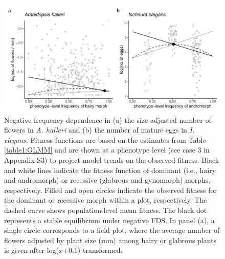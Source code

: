 \documentclass[12pt,]{article}
\begin{document}
\begin{figure}[ht]
  \includegraphics[width=0.75\linewidth]{Ah_Ie_plots.pdf}
  \caption{Negative frequency dependence in (a) the size-adjusted number of flowers in \textit{A. halleri} and (b) the number of mature eggs in \textit{I. elegans}. Fitness functions are based on the estimates from Table \ref{table1:GLMM} and are shown at a phenotype level (see case 3 in Appendix S3) to project model trends on the observed fitness. Black and white lines indicate the fitness function of dominant (i.e., hairy and andromorph) or recessive (glabrous and gynomorph) morphs, respectively. Filled and open circles indicate the observed fitness for the dominant or recessive morph within a plot, respectively. The dashed curve shows population-level mean fitness. The black dot represents a stable equilibrium under negative FDS. In panel (a), a single circle corresponds to a field plot, where the average number of flowers adjusted by plant size (mm) among hairy or glabrous plants is given after log($x$+0.1)-transformed.}
  \label{fig3:GLMM}
\end{figure}
\end{document}
